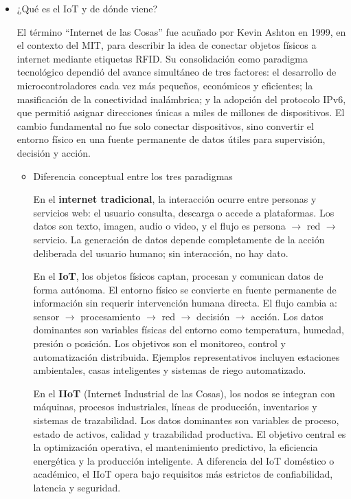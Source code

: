 \begin{itemize}

    \item ¿Qué es el IoT y de dónde viene?

    El término ``Internet de las Cosas'' fue acuñado por Kevin Ashton en 1999, en el contexto del MIT, para describir la idea de conectar objetos físicos a internet mediante etiquetas RFID. Su consolidación como paradigma tecnológico dependió del avance simultáneo de tres factores: el desarrollo de microcontroladores cada vez más pequeños, económicos y eficientes; la masificación de la conectividad inalámbrica; y la adopción del protocolo IPv6, que permitió asignar direcciones únicas a miles de millones de dispositivos. El cambio fundamental no fue solo conectar dispositivos, sino convertir el entorno físico en una fuente permanente de datos útiles para supervisión, decisión y acción.

        \begin{itemize}

            \item Diferencia conceptual entre los tres paradigmas

            En el \textbf{internet tradicional}, la interacción ocurre entre personas y servicios web: el usuario consulta, descarga o accede a plataformas. Los datos son texto, imagen, audio o video, y el flujo es persona $\rightarrow$ red $\rightarrow$ servicio. La generación de datos depende completamente de la acción deliberada del usuario humano; sin interacción, no hay dato.

            En el \textbf{IoT}, los objetos físicos captan, procesan y comunican datos de forma autónoma. El entorno físico se convierte en fuente permanente de información sin requerir intervención humana directa. El flujo cambia a: sensor $\rightarrow$ procesamiento $\rightarrow$ red $\rightarrow$ decisión $\rightarrow$ acción. Los datos dominantes son variables físicas del entorno como temperatura, humedad, presión o posición. Los objetivos son el monitoreo, control y automatización distribuida. Ejemplos representativos incluyen estaciones ambientales, casas inteligentes y sistemas de riego automatizado.

            En el \textbf{IIoT} (Internet Industrial de las Cosas), los nodos se integran con máquinas, procesos industriales, líneas de producción, inventarios y sistemas de trazabilidad. Los datos dominantes son variables de proceso, estado de activos, calidad y trazabilidad productiva. El objetivo central es la optimización operativa, el mantenimiento predictivo, la eficiencia energética y la producción inteligente. A diferencia del IoT doméstico o académico, el IIoT opera bajo requisitos más estrictos de confiabilidad, latencia y seguridad.


\end{itemize}
\end{itemize}
